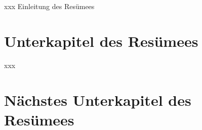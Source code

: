 
xxx  Einleitung des Resümees

\section{Unterkapitel des Resümees}

xxx 

\section{Nächstes Unterkapitel des  Resümees} 


